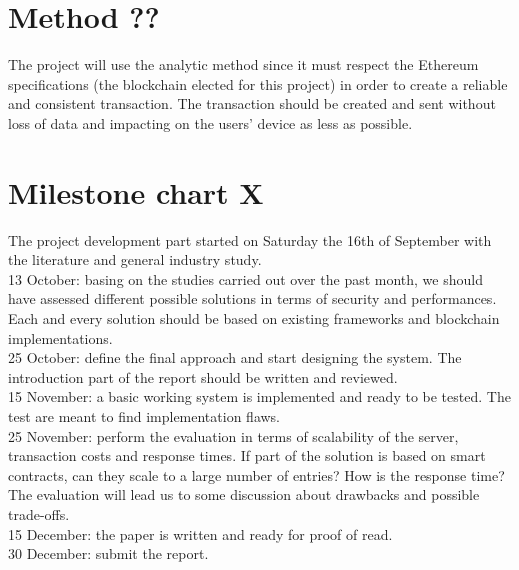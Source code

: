 \documentclass[paper=a4, fontsize=11pt]{scrartcl} %
\numberwithin{equation}{section} %
\numberwithin{figure}{section} %
\numberwithin{table}{section} %
\begin{document}
\section{Method ??}

The project will use the analytic method since it must respect the Ethereum specifications (the blockchain elected for this project) in order to create a reliable and consistent transaction. The transaction should be created and sent without loss of data and impacting on the users' device as less as possible.

\section{Milestone chart X}

The project development part started on Saturday the 16th of September with the literature and general industry study. \\

13 October: basing on the studies carried out over the past month, we should have assessed different possible solutions in terms of security and performances. Each and every solution should be based on existing frameworks and blockchain implementations. \\

25 October: define the final approach and start designing the system. The introduction part of the report should be written and reviewed. \\

15 November: a basic working system is implemented and ready to be tested. The test are meant to find implementation flaws. \\

25 November: perform the evaluation in terms of scalability of the server, transaction costs and response times. If part of the solution is based on smart contracts, can they scale to a large number of entries? How is the response time? The evaluation will lead us to some discussion about drawbacks and possible trade-offs. \\

15 December: the paper is written and ready for proof of read. \\

30 December: submit the report. \\

\printbibliography
% 
\end{document}
